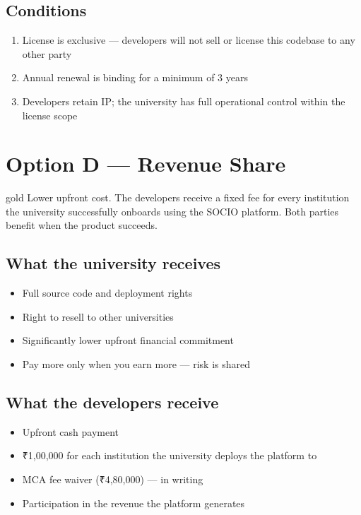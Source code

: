 \documentclass[12pt,a4paper]{article}
\begin{document}
\subsection*{Conditions}
\begin{enumerate}[leftmargin=*, noitemsep]
    \item License is exclusive — developers will not sell or license this codebase to any other party
    \item Annual renewal is binding for a minimum of 3 years
    \item Developers retain IP; the university has full operational control within the license scope
\end{enumerate}

\newpage
\section{Option D — Revenue Share}

\begin{scenariobox}{gold}
Lower upfront cost. The developers receive a fixed fee for every institution the university successfully onboards using the SOCIO platform. Both parties benefit when the product succeeds.
\end{scenariobox}

\vspace{0.4cm}

\subsection*{What the university receives}
\begin{itemize}[leftmargin=*, noitemsep]
    \item Full source code and deployment rights
    \item Right to resell to other universities
    \item Significantly lower upfront financial commitment
    \item Pay more only when you earn more — risk is shared
\end{itemize}

\subsection*{What the developers receive}
\begin{itemize}[leftmargin=*, noitemsep]
    \item Upfront cash payment
    \item ₹1,00,000 for each institution the university deploys the platform to
    \item MCA fee waiver (₹4,80,000) — in writing
    \item Participation in the revenue the platform generates
\end{itemize}
\end{document}
